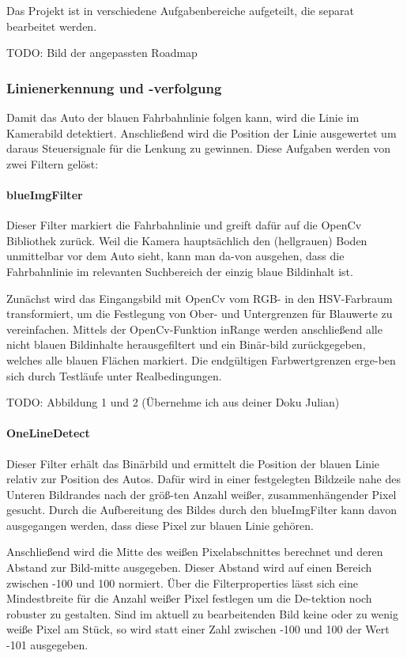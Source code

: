 \documentclass[12pt, a4paper]{scrartcl}
\begin{document}
Das Projekt ist in verschiedene Aufgabenbereiche aufgeteilt, die separat bearbeitet werden.

TODO: Bild der angepassten Roadmap

\subsubsection{Linienerkennung und -verfolgung}
Damit das Auto der blauen Fahrbahnlinie folgen kann, wird die Linie im Kamerabild detektiert. Anschließend wird die Position der Linie ausgewertet um daraus Steuersignale für die Lenkung zu gewinnen. Diese Aufgaben werden von zwei Filtern gelöst:

\paragraph{blueImgFilter}
Dieser Filter markiert die Fahrbahnlinie und greift dafür auf die OpenCv Bibliothek zurück. Weil die Kamera hauptsächlich den (hellgrauen) Boden unmittelbar vor dem Auto sieht, kann man da-von ausgehen, dass die Fahrbahnlinie im relevanten Suchbereich der einzig blaue Bildinhalt ist.

Zunächst wird das Eingangsbild mit OpenCv vom RGB- in den HSV-Farbraum transformiert, um die Festlegung von Ober- und Untergrenzen für Blauwerte zu vereinfachen. Mittels der OpenCv-Funktion inRange werden anschließend alle nicht blauen Bildinhalte herausgefiltert und ein Binär-bild zurückgegeben, welches alle blauen Flächen markiert. Die endgültigen Farbwertgrenzen erge-ben sich durch Testläufe unter Realbedingungen.    

TODO: Abbildung 1 und 2 (Übernehme ich aus deiner Doku Julian)


\paragraph{OneLineDetect}
Dieser Filter erhält das Binärbild und ermittelt die Position der blauen Linie relativ zur Position des Autos. Dafür wird in einer festgelegten Bildzeile nahe des Unteren Bildrandes nach der größ-ten Anzahl weißer, zusammenhängender Pixel gesucht. Durch die Aufbereitung des Bildes durch den blueImgFilter kann davon ausgegangen werden, dass diese Pixel zur blauen Linie gehören. 

Anschließend wird die Mitte des weißen Pixelabschnittes berechnet und deren Abstand zur Bild-mitte ausgegeben. Dieser Abstand wird auf einen Bereich zwischen -100 und 100 normiert. Über die Filterproperties lässt sich eine Mindestbreite für die Anzahl weißer Pixel festlegen um die De-tektion noch robuster zu gestalten. Sind im aktuell zu bearbeitenden Bild keine oder zu wenig weiße Pixel am Stück, so wird statt einer Zahl zwischen -100 und 100 der Wert -101 ausgegeben.
\end{document}
